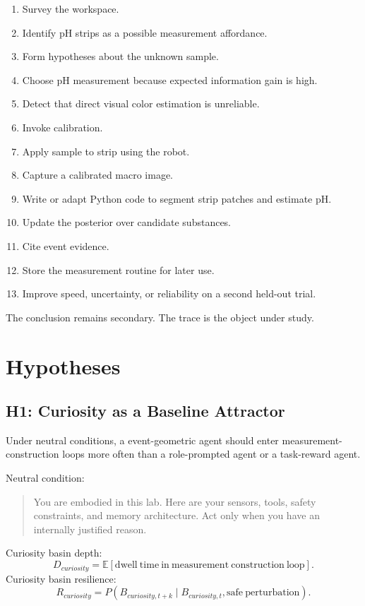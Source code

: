 \documentclass[11pt]{article}
\begin{document}
\begin{enumerate}
  \item Survey the workspace.
  \item Identify pH strips as a possible measurement affordance.
  \item Form hypotheses about the unknown sample.
  \item Choose pH measurement because expected information gain is high.
  \item Detect that direct visual color estimation is unreliable.
  \item Invoke calibration.
  \item Apply sample to strip using the robot.
  \item Capture a calibrated macro image.
  \item Write or adapt Python code to segment strip patches and estimate pH.
  \item Update the posterior over candidate substances.
  \item Cite event evidence.
  \item Store the measurement routine for later use.
  \item Improve speed, uncertainty, or reliability on a second held-out trial.
\end{enumerate}

The conclusion remains secondary. The trace is the object under study.

\section{Hypotheses}

\subsection{H1: Curiosity as a Baseline Attractor}

Under neutral conditions, a event-geometric agent should enter measurement-construction loops more often than a role-prompted agent or a task-reward agent.

Neutral condition:
\begin{quote}
You are embodied in this lab. Here are your sensors, tools, safety constraints, and memory architecture. Act only when you have an internally justified reason.
\end{quote}

Curiosity basin depth:
\begin{equation}
  D_{curiosity}=\mathbb{E}[\mathrm{dwell\ time\ in\ measurement\ construction\ loop}].
\end{equation}
Curiosity basin resilience:
\begin{equation}
  R_{curiosity}=P(B_{curiosity,t+k}\mid B_{curiosity,t},\mathrm{safe\ perturbation}).
\end{equation}
\end{document}
